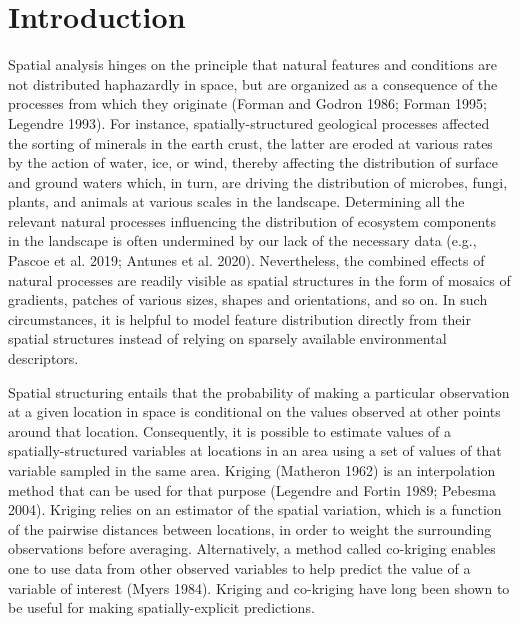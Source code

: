 \documentclass[
]{article}
\begin{document}
\section{Introduction}\label{introduction}

Spatial analysis hinges on the principle that natural features and
conditions are not distributed haphazardly in space, but are organized
as a consequence of the processes from which they originate (Forman and
Godron 1986; Forman 1995; Legendre 1993). For instance,
spatially-structured geological processes affected the sorting of
minerals in the earth crust, the latter are eroded at various rates by
the action of water, ice, or wind, thereby affecting the distribution of
surface and ground waters which, in turn, are driving the distribution
of microbes, fungi, plants, and animals at various scales in the
landscape. Determining all the relevant natural processes influencing
the distribution of ecosystem components in the landscape is often
undermined by our lack of the necessary data (e.g., Pascoe et al. 2019;
Antunes et al. 2020). Nevertheless, the combined effects of natural
processes are readily visible as spatial structures in the form of
mosaics of gradients, patches of various sizes, shapes and orientations,
and so on. In such circumstances, it is helpful to model feature
distribution directly from their spatial structures instead of relying
on sparsely available environmental descriptors.

Spatial structuring entails that the probability of making a particular
observation at a given location in space is conditional on the values
observed at other points around that location. Consequently, it is
possible to estimate values of a spatially-structured variables at
locations in an area using a set of values of that variable sampled in
the same area. Kriging (Matheron 1962) is an interpolation method that
can be used for that purpose (Legendre and Fortin 1989; Pebesma 2004).
Kriging relies on an estimator of the spatial variation, which is a
function of the pairwise distances between locations, in order to weight
the surrounding observations before averaging. Alternatively, a method
called co-kriging enables one to use data from other observed variables
to help predict the value of a variable of interest (Myers 1984).
Kriging and co-kriging have long been shown to be useful for making
spatially-explicit predictions.
\end{document}
